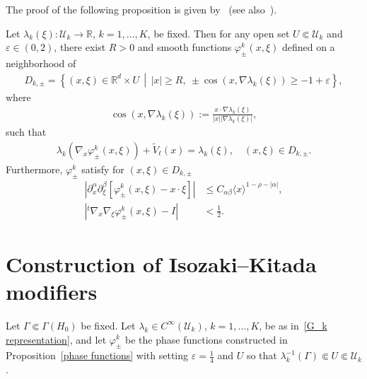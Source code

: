 \documentclass[10pt]{amsart}
\theoremstyle{definition}\newtheorem{defi}[theo]{Definition}\newtheorem{rema}[theo]{Remark}\newtheorem{exam}[theo]{Example}\newtheorem{exem}[theo]{Example}\newtheorem{nota}[theo]{Notation}
\newcommand{\e}{\varepsilon}
\newcommand{\f}{\varphi}
\renewcommand{\l}{\lambda}
\newcommand{\x}{\xi}
\newcommand{\R}{\mathbb{R}}
\newcommand{\US}{\mathcal{U}}
\begin{document}
The proof of the following proposition is given by~\cite[Section~2]{N3} (see also~\cite{IsoKita,T1}).

\begin{prop}\label{phase functions}
Let $\l_k(\x):\US_k\to\R$, $k=1,\dots,K$, be fixed. Then for any open set $U \Subset \US_k$ and $\e\in(0,2)$, there exist $R>0$ and smooth functions $\f_\pm^k(x,\x)$ defined on a neighborhood of
\begin{align*}
D_{k,\pm} = \left\{(x,\x)\in \R^d \times U \,\middle|\, |x| \geq R, \ \pm \cos(x,\nabla\lambda_k(\x)) \geq-1+\e \right\},
\end{align*}
where
\begin{align*}
\cos(x,\nabla\l_k(\x)) := \frac{x\cdot\nabla\l_k(\x)}{|x| |\nabla\l_k(\x)|},
\end{align*}
such that
\begin{align}\label{eikonal}
\l_k\left(\nabla_x\f_\pm^k(x,\x)\right) + \tilde V_\ell(x) = \l_k(\x), \quad (x,\x) \in D_{k,\pm}.
\end{align}
Furthermore, $\f_\pm^k$ satisfy for $(x,\xi)\in D_{k,\pm}$
\begin{align}
\left|\partial_x^\alpha\partial_\xi^\beta\left[\varphi_\pm^k(x,\xi)-x\cdot\xi\right]\right| &\leq C_{\alpha\beta} \langle x\rangle^{1-\rho-|\alpha|}, \label{phase estimate}
\\
\left|{}^t\nabla_x\nabla_\xi\varphi_\pm^k(x,\xi)-I \right|&<\frac{1}{2}. \label{phase estimate2}
\end{align}
\end{prop}


\section{Construction of Isozaki--Kitada modifiers}\label{IK section}

Let $\Gamma\Subset\Gamma(H_0)$ be fixed. Let $\l_k \in C^\infty(\US_k)$, $k=1,\dots,K$, be as in~\eqref{G_k representation}, and let $\f_{\pm}^{k}$ be the phase functions constructed in Proposition~\ref{phase functions} with setting $\e=\frac14$ and $U$ so that $\l_k^{-1}(\Gamma)\Subset U \Subset \US_k$.
\end{document}
